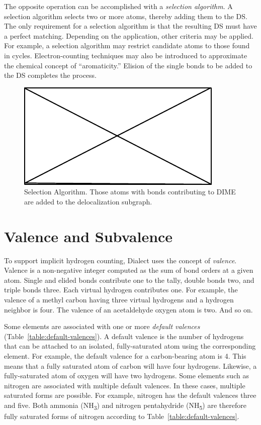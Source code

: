 \documentclass{article}
\begin{document}
The opposite operation can be accomplished with a \textit{selection algorithm}. A selection algorithm selects two or more atoms, thereby adding them to the DS. The only requirement for a selection algorithm is that the resulting DS must have a perfect matching. Depending on the application, other criteria may be applied. For example, a selection algorithm may restrict candidate atoms to those found in cycles. Electron-counting techniques may also be introduced to approximate the chemical concept of \enquote{aromaticity.} Elision of the single bonds to be added to the DS completes the process.

\begin{figure}
    \centering
    \includegraphics{filler}
    \caption{Selection Algorithm. Those atoms with bonds contributing to DIME are added to the delocalization subgraph.}
    \label{fig:selection}
\end{figure}

\section*{Valence and Subvalence}

To support implicit hydrogen counting, Dialect uses the concept of \textit{valence}. Valence is a non-negative integer computed as the sum of bond orders at a given atom. Single and elided bonds contribute one to the tally, double bonds two, and triple bonds three. Each virtual hydrogen contributes one. For example, the valence of a methyl carbon having three virtual hydrogens and a hydrogen neighbor is four. The valence of an acetaldehyde oxygen atom is two. And so on.

Some elements are associated with one or more \textit{default valences} (Table~\ref{table:default-valences}). A default valence is the number of hydrogens that can be attached to an isolated, fully-saturated atom using the corresponding element. For example, the default valence for a carbon-bearing atom is 4. This means that a fully saturated atom of carbon will have four hydrogens. Likewise, a fully-saturated atom of oxygen will have two hydrogens. Some elements such as nitrogen are associated with multiple default valences. In these cases, multiple saturated forms are possible. For example, nitrogen has the default valences three and five. Both ammonia (NH\textsubscript{3}) and nitrogen pentahydride (NH\textsubscript{5}) are therefore fully saturated forms of nitrogen according to Table~\ref{table:default-valences}.
\end{document}
